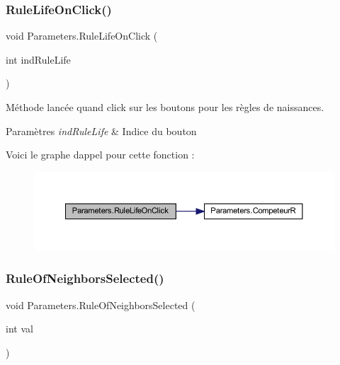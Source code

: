 \subsubsection{\texorpdfstring{Rule\+Life\+On\+Click()}{RuleLifeOnClick()}}
{\footnotesize\ttfamily void Parameters.\+Rule\+Life\+On\+Click (\begin{DoxyParamCaption}\item[{int}]{ind\+Rule\+Life }\end{DoxyParamCaption})\hspace{0.3cm}{\ttfamily [inline]}}



Méthode lancée quand click sur les boutons pour les règles de naissances. 


\begin{DoxyParams}{Paramètres}
{\em ind\+Rule\+Life} & Indice du bouton\\
\hline
\end{DoxyParams}
Voici le graphe d\textquotesingle{}appel pour cette fonction \+:
\nopagebreak
\begin{figure}[H]
\begin{center}
\leavevmode
\includegraphics[width=350pt]{class_parameters_ae90c0f90420620d98950ac50b9f24782_cgraph}
\end{center}
\end{figure}
\mbox{\label{class_parameters_af47f2d06943667d50ffbc35743ad522c}} 
\subsubsection{\texorpdfstring{Rule\+Of\+Neighbors\+Selected()}{RuleOfNeighborsSelected()}}
{\footnotesize\ttfamily void Parameters.\+Rule\+Of\+Neighbors\+Selected (\begin{DoxyParamCaption}\item[{int}]{val }\end{DoxyParamCaption})\hspace{0.3cm}{\ttfamily [inline]}}



